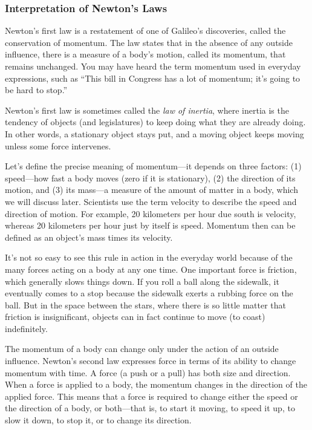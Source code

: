 \documentclass[main-astronomy.tex]{subfiles}
\begin{document}
\subsubsection*{Interpretation of Newton's Laws}

Newton’s first law is a restatement of one of Galileo’s discoveries, called the conservation of momentum. The law states that in the absence of any outside influence, there is a measure of a body’s motion, called its \gls{momentum}, that remains unchanged. You may have heard the term momentum used in everyday expressions, such as ``This bill in Congress has a lot of momentum; it’s going to be hard to stop.''

\vspace{1em}

Newton’s first law is sometimes called the \textit{law of inertia}, where inertia is the tendency of objects (and legislatures) to keep doing what they are already doing. In other words, a stationary object stays put, and a moving object keeps moving unless some force intervenes.

\vspace{1em}

Let’s define the precise meaning of momentum---it depends on three factors: (1) speed---how fast a body moves (zero if it is stationary), (2) the direction of its motion, and (3) its mass---a measure of the amount of matter in a body, which we will discuss later. Scientists use the term \gls{velocity} to describe the speed and direction of motion. For example, 20 kilometers per hour due south is velocity, whereas 20 kilometers per hour just by itself is speed. Momentum then can be defined as an object’s mass times its velocity.

\vspace{1em}

It’s not so easy to see this rule in action in the everyday world because of the many forces acting on a body at any one time. One important force is friction, which generally slows things down. If you roll a ball along the sidewalk, it eventually comes to a stop because the sidewalk exerts a rubbing force on the ball. But in the space between the stars, where there is so little matter that friction is insignificant, objects can in fact continue to move (to coast) indefinitely.

\vspace{1em}

The momentum of a body can change only under the action of an outside influence. Newton’s second law expresses force in terms of its ability to change momentum with time. A force (a push or a pull) has both size and direction. When a force is applied to a body, the momentum changes in the direction of the applied force. This means that a force is required to change either the speed or the direction of a body, or both---that is, to start it moving, to speed it up, to slow it down, to stop it, or to change its direction.
\end{document}
